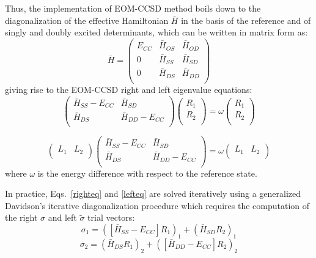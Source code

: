 \documentclass[journal=jctcce,manuscript=article]{achemso}
\begin{document}
Thus, the implementation of EOM-CCSD method boils down to the diagonalization of the effective Hamiltonian $\bar{H}$ in the basis of the reference and of singly and doubly excited determinants, which can be written in matrix form as:
\begin{equation}
\label{Hbar}
\bar{H} = 
\begin{pmatrix}
E_{CC} & \bar{H}_{OS} & \bar{H}_{OD} \\
0 & \bar{H}_{SS} & \bar{H}_{SD} \\
0 & \bar{H}_{DS} & \bar{H}_{DD} \\
\end{pmatrix}
\end{equation}
giving rise to the EOM-CCSD right and left eigenvalue equations:
\begin{equation}
\label{righteq}
\begin{pmatrix}
\bar{H}_{SS} - E_{CC} & \bar{H}_{SD} \\
\bar{H}_{DS} & \bar{H}_{DD} - E_{CC} \\
\end{pmatrix}
\begin{pmatrix}
R_1 \\
R_2 \\
\end{pmatrix} 
= \omega 
\begin{pmatrix}
R_1 \\
R_2 \\
\end{pmatrix}
\end{equation}

\begin{equation}
\label{lefteq}
\begin{pmatrix}
L_1 & L_2 \\
\end{pmatrix} 
\begin{pmatrix}
\bar{H}_{SS} - E_{CC} & \bar{H}_{SD} \\
\bar{H}_{DS} & \bar{H}_{DD} - E_{CC} \\
\end{pmatrix}
= \omega
\begin{pmatrix}
L_1 & L_2 \\
\end{pmatrix}
\end{equation}
where $\omega$ is the energy difference with respect to the reference state.

In practice, Eqs.~\eqref{righteq} and \eqref{lefteq} are solved iteratively using a generalized Davidson's iterative diagonalization procedure\cite{Davidson,hirao1982generalization,rettrup1982iterative} which requires the computation of the right $\sigma$ and left $\tilde{\sigma}$ trial vectors:
\begin{equation} 
\sigma_1 = ([\bar{H}_{SS}-E_{CC}]R_1)_1 + (\bar{H}_{SD}R_2)_1
\end{equation}
\begin{equation} 
\sigma_2 = (\bar{H}_{DS}R_1)_2 + ([\bar{H}_{DD}-E_{CC}]R_2)_2
\end{equation}
\end{document}
